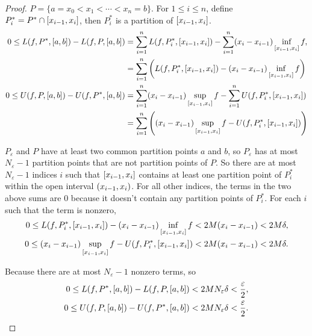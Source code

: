 \begin{proof}
    $P = \{ a = x_{0} < x_{1} < \cdots < x_{n} = b \}$. For $1\leq i \leq n$, define $P^{*}_{i} = P^{*} \cap \left[{x_{i-1}, x_{i}}\right]$, then $P^{*}_{i}$ is a partition of $\left[{x_{i-1}, x_{i}}\right]$.
    \begingroup
    \allowdisplaybreaks{}
    \begin{align*}
        0 \leq L(f, P^{*}, \left[{a,b}\right]) - L(f, P, \left[{a,b}\right]) & = \sum^{n}_{i=1}L(f, P^{*}_{i}, \left[{x_{i-1}, x_{i}}\right]) - \sum^{n}_{i=1}(x_{i} - x_{i-1})\inf\limits_{\left[{x_{i-1}, x_{i}}\right]}f, \\
                                                                                 & = \sum^{n}_{i=1}\left(L(f, P^{*}_{i}, \left[{x_{i-1}, x_{i}}\right]) - (x_{i} - x_{i-1})\inf\limits_{\left[{x_{i-1}, x_{i}}\right]}f\right)   \\
        0 \leq U(f, P, \left[{a,b}\right]) - U(f, P^{*}, \left[{a,b}\right]) & =  \sum^{n}_{i=1}(x_{i} - x_{i-1})\sup\limits_{\left[{x_{i-1}, x_{i}}\right]}f - \sum^{n}_{i=1}U(f, P^{*}_{i}, \left[{x_{i-1}, x_{i}}\right]) \\
                                                                                 & = \sum^{n}_{i=1}\left((x_{i} - x_{i-1})\sup\limits_{\left[{x_{i-1}, x_{i}}\right]}f - U(f, P^{*}_{i}, \left[{x_{i-1}, x_{i}}\right])\right)
    \end{align*}
    \endgroup

    $P_{\varepsilon}$ and $P$ have at least two common partition points $a$ and $b$, so $P_{\varepsilon}$ has at most $N_{\varepsilon} - 1$ partition points that are not partition points of $P$. So there are at most $N_{\varepsilon} - 1$ indices $i$ such that $\left[{x_{i-1}, x_{i}}\right]$ contains at least one partition point of $P^{*}_{i}$ within the open interval $\left({x_{i-1}, x_{i}}\right)$. For all other indices, the terms in the two above sums are $0$ because it doesn't contain any partition points of $P^{*}_{i}$. For each $i$ such that the term is nonzero,
    \[
        \begin{split}
            0\leq L(f, P^{*}_{i}, \left[{x_{i-1}, x_{i}}\right]) - (x_{i} - x_{i-1})\inf\limits_{\left[{x_{i-1}, x_{i}}\right]}f < 2M(x_{i} - x_{i-1}) < 2M\delta, \\
            0\leq (x_{i} - x_{i-1})\sup\limits_{\left[{x_{i-1}, x_{i}}\right]}f - U(f, P^{*}_{i}, \left[{x_{i-1}, x_{i}}\right]) < 2M(x_{i} - x_{i-1}) < 2M\delta.
        \end{split}
    \]

    Because there are at most $N_{\varepsilon} - 1$ nonzero terms, so
    \[
        \begin{split}
            0 \leq L(f, P^{*}, \left[{a,b}\right]) - L(f, P, \left[{a,b}\right]) < 2MN_{\varepsilon}\delta < \frac{\varepsilon}{2}, \\
            0 \leq U(f, P, \left[{a,b}\right]) - U(f, P^{*}, \left[{a,b}\right]) < 2MN_{\varepsilon}\delta < \frac{\varepsilon}{2}.
        \end{split}
    \]


\end{proof}
